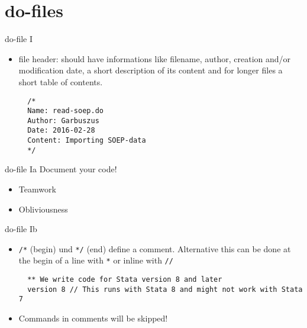 \section{do-files}
\begin{frame}[fragile]{do-file I}
  \begin{itemize}
  \item file header: should have informations like filename, author, creation and/or modification date, a short description of its content and for longer files a short table of contents.
    
  \begin{lstlisting}
  /*
  Name: read-soep.do
  Author: Garbuszus
  Date: 2016-02-28
  Content: Importing SOEP-data
  */
  \end{lstlisting}
  \end{itemize}
\end{frame}

\begin{frame}{do-file Ia}
Document your code! 
\begin{itemize}
\item Teamwork
\item Obliviousness 
\end{itemize}

  

\end{frame}


\begin{frame}[fragile]{do-file Ib}
\begin{itemize} 
   \item \texttt{/*} (begin) und \texttt{*/} (end) define a comment. Alternative this can be done at the begin of a line with \texttt{*} or inline with \texttt{//}
  
  \begin{lstlisting}
  ** We write code for Stata version 8 and later
  version 8 // This runs with Stata 8 and might not work with Stata 7
  \end{lstlisting}
  \item Commands in comments will be skipped!
  \end{itemize}
\end{frame}

